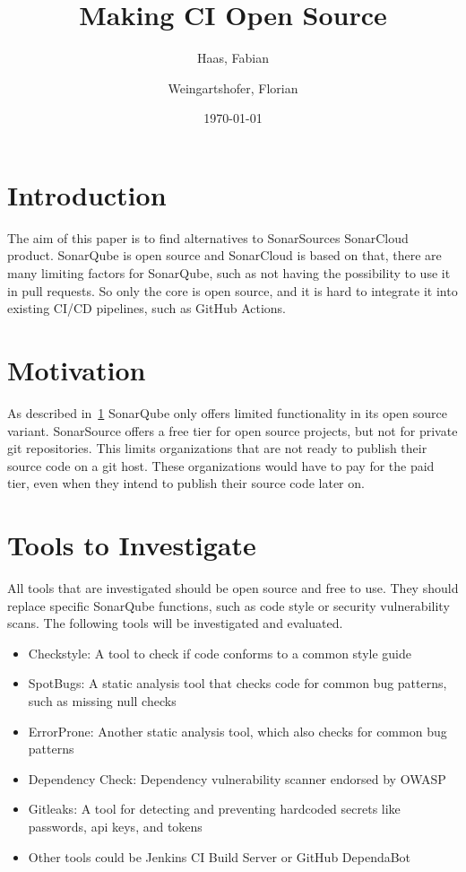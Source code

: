\documentclass[11pt,journal]{IEEEtran}
\title{Making CI Open Source}
\author{
    Haas, Fabian\\
    \and
    Weingartshofer, Florian
}
\date{\today}
\begin{document}
    \maketitle


    \section{Introduction}\label{sec:introduction}
    The aim of this paper is to find alternatives to SonarSources SonarCloud product.
    SonarQube is open source and SonarCloud is based on that, there are many limiting factors for SonarQube, such as not having the possibility to use it in pull requests.
    So only the core is open source, and it is hard to integrate it into existing CI/CD pipelines, such as GitHub Actions.

    \section{Motivation}\label{sec:motivation}
    As described in\ \ref{sec:introduction} SonarQube only offers limited functionality in its open source variant.
    SonarSource offers a free tier for open source projects, but not for private git repositories.
    This limits organizations that are not ready to publish their source code on a git host.
    These organizations would have to pay for the paid tier, even when they intend to publish their source code later on.

    \section{Tools to Investigate}\label{sec:tools-to-investigate}
    All tools that are investigated should be open source and free to use.
    They should replace specific SonarQube functions, such as code style or security vulnerability scans.
    The following tools will be investigated and evaluated.
    \begin{itemize}
        \item Checkstyle: A tool to check if code conforms to a common style guide
        \item SpotBugs: A static analysis tool that checks code for common bug patterns, such as missing null checks
        \item ErrorProne: Another static analysis tool, which also checks for common bug patterns
        \item Dependency Check: Dependency vulnerability scanner endorsed by OWASP
        \item Gitleaks: A tool for detecting and preventing hardcoded secrets like passwords, api keys, and tokens
        \item Other tools could be Jenkins CI Build Server or GitHub DependaBot
    \end{itemize}
\end{document}
